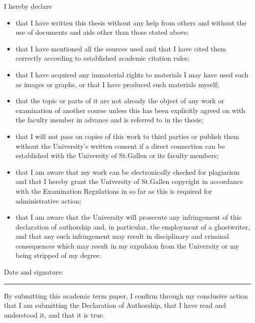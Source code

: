 \noindent I hereby declare
\begin{itemize}
\item that I have written this thesis without any help from others and without the use of documents and aids other than those stated above;
\item that I have mentioned all the sources used and that I have cited them correctly according to established academic citation rules;
\item that I have acquired any immaterial rights to materials I may have used such as images or graphs, or that I have produced such materials myself;
\item that the topic or parts of it are not already the object of any work or examination of another course unless this has been explicitly agreed on with the faculty member in advance and is referred to in the thesis;
\item that I will not pass on copies of this work to third parties or publish them without the University’s written consent if a direct connection can be established with the University of St.Gallen or its faculty members;
\item that I am aware that my work can be electronically checked for plagiarism and that I hereby grant the University of St.Gallen copyright in accordance with the Examination Regulations in so far as this is required for administrative action;
\item that I am aware that the University will prosecute any infringement of this declaration of authorship and, in particular, the employment of a ghostwriter, and that any such infringement may result in disciplinary and criminal consequences which may result in my expulsion from the University or my being stripped of my degree.
\end{itemize}

Date and signature: \\
\rule[0.75em]{30em}{0.35pt}

By submitting this academic term paper, I confirm through my conclusive action that I am submitting the Declaration of Authorship, that I have read and understood it, and that it is true.





\clearpage